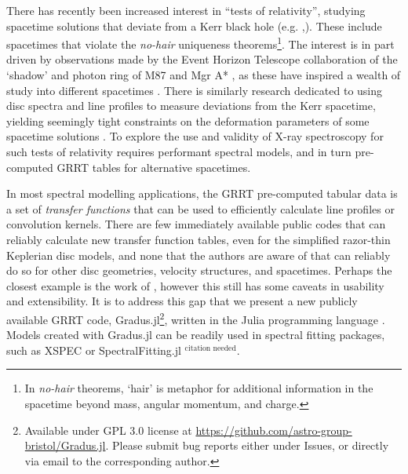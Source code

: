 \documentclass[fleqn,usenatbib]{mnras}
\newcommand{\citneeded}{{\bf \color{red} $^{\text{citation needed}}$}}
\newcommand{\Gradus}{{\sc Gradus.jl}\xspace}
\newcommand{\software}[1]{{\sc #1}}
\begin{document}
There has recently been increased interest in ``tests of relativity'', studying
spacetime solutions that deviate from a Kerr black hole (e.g.
\citealt{johannsen_testing_2010, chrusciel_stationary_2012, bambi_testing_2022,
patra_accretion_2023, chen_observational_2024},). These include spacetimes that
violate the \textit{no-hair} uniqueness theorems\footnote{In \emph{no-hair}
theorems, `hair' is metaphor for additional information in the spacetime beyond
mass, angular momentum, and charge.}. The interest is in part driven by
observations made by the Event Horizon Telescope collaboration of the `shadow'
and photon ring of M87 and Mgr A*
\citep{the_event_horizon_telescope_collaboration_first_2019,
the_event_horizon_telescope_collaboration_first_2023}, as these have inspired a
wealth of study into different spacetimes \citep[see][]{eht_non_kerr_2022}.
There is similarly research dedicated to using disc spectra and line profiles to
measure deviations from the Kerr spacetime, yielding seemingly tight constraints
on the deformation parameters of some spacetime solutions
\citep[e.g.][]{bambi_precision_measuremets_2021}. To explore the use and
validity of X-ray spectroscopy for such tests of relativity requires performant
spectral models, and in turn pre-computed GRRT tables for alternative
spacetimes.

In most spectral modelling applications, the GRRT pre-computed tabular data is a
set of \textit{transfer functions} that can be used to efficiently calculate
line profiles or convolution kernels. There are few immediately available public
codes that can reliably calculate new transfer function tables, even for the
simplified razor-thin Keplerian disc models, and none that the authors are aware
of that can reliably do so for other disc geometries, velocity structures, and
spacetimes. Perhaps the closest example is the work of
\citep{taylor_exploring_2018}, however this still has some caveats in usability
and extensibility. It is to address this gap that we present a new publicly
available GRRT code, Gradus.jl\footnote{Available under GPL 3.0 license at
\url{https://github.com/astro-group-bristol/Gradus.jl}. Please submit bug
reports either under Issues, or directly via email to the corresponding
author.}, written in the Julia programming language
\citep{Bezanson_Julia_A_fresh_2017}. Models created with \Gradus can be readily
used in spectral fitting packages, such as \software{XSPEC}
\citep{arnaud_xspec_1996} or \software{SpectralFitting.jl} \citneeded.

\end{document}
